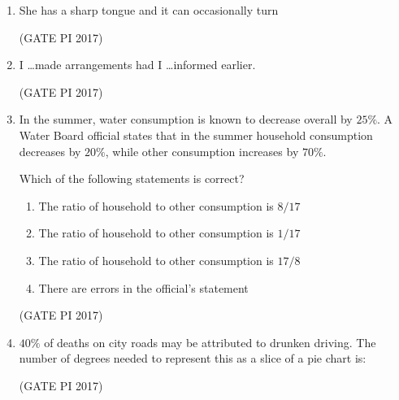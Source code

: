 \documentclass[journal,12pt,onecolumn]{IEEEtran}
\theoremstyle{remark}
\begin{document}
\begin{enumerate}
\item She has a sharp tongue and it can occasionally turn
\begin{enumerate}
\end{enumerate}
\hfill (GATE PI 2017)

\item I \dots made arrangements had I \dots informed earlier.
\begin{enumerate}
\end{enumerate}
\hfill (GATE PI 2017)

\item In the summer, water consumption is known to decrease overall by $25\%$.  
A Water Board official states that in the summer household consumption decreases by $20\%$, while other consumption increases by $70\%$.  

Which of the following statements is correct?
\begin{enumerate}
\item The ratio of household to other consumption is $8/17$
\item The ratio of household to other consumption is $1/17$
\item The ratio of household to other consumption is $17/8$
\item There are errors in the official's statement
\end{enumerate}
\hfill (GATE PI 2017)

\item $40\%$ of deaths on city roads may be attributed to drunken driving.  
The number of degrees needed to represent this as a slice of a pie chart is:
\begin{enumerate}
\end{enumerate}
\hfill (GATE PI 2017)


\end{enumerate}
\end{document}

